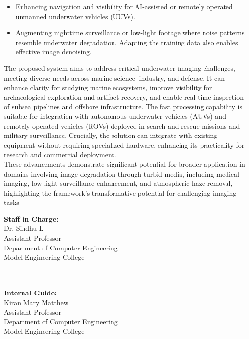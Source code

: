 \documentclass[12pt]{article}
\begin{document}
\begin{itemize}
    \item Enhancing navigation and visibility for AI-assisted or remotely operated unmanned underwater vehicles (UUVs).
    \item  Augmenting nighttime surveillance or low-light footage where noise patterns resemble underwater degradation. Adapting the training data also enables effective image denoising.
\end{itemize}

The proposed system aims to address critical underwater imaging challenges, meeting diverse needs across marine science, industry, and defense. It can enhance clarity for studying marine ecosystems, improve visibility for archaeological exploration and artifact recovery, and enable real-time inspection of subsea pipelines and offshore infrastructure. The fast processing capability is suitable for integration with autonomous underwater vehicles (AUVs) and remotely operated vehicles (ROVs) deployed in search-and-rescue missions and military surveillance. Crucially, the solution can integrate with existing equipment without requiring specialized hardware, enhancing its practicality for research and commercial deployment.\\

These advancements demonstrate significant potential for broader application in domains involving image degradation through turbid media, including medical imaging, low-light surveillance enhancement, and atmospheric haze removal, highlighting the framework's transformative potential for challenging imaging tasks\\

\nocite{*}



\vspace{0.5cm}

\noindent
\textbf{Staff in Charge:}\\
Dr. Sindhu L\\
Assistant Professor\\
Department of Computer Engineering\\
Model Engineering College

\vspace{0.5cm}

\noindent
\\
\\
\textbf{Internal Guide:}\\
Kiran Mary Matthew\\
Assistant Professor\\
Department of Computer Engineering\\
Model Engineering College
\end{document}
